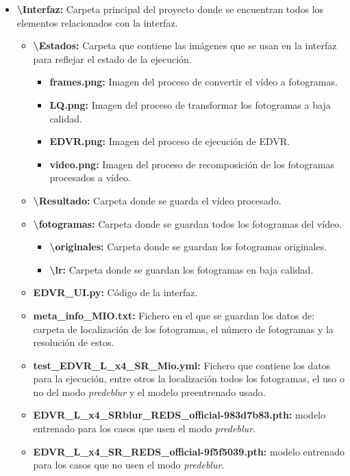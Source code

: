 \begin{itemize}
	\item \textbf{\textbackslash  Interfaz:} Carpeta principal del proyecto donde se encuentran todos los elementos relacionados con la interfaz.
	\begin{itemize}
		\item\textbf{\textbackslash  Estados:} Carpeta que contiene las imágenes que se usan en la interfaz para reflejar el estado de la ejecución.
		\begin{itemize}
			\item\textbf{frames.png:} Imagen del proceso de convertir el vídeo a fotogramas.
			\item\textbf{LQ.png:} Imagen del proceso de transformar los fotogramas a baja calidad.
			\item\textbf{EDVR.png:} Imagen del proceso de ejecución de EDVR.
			\item\textbf{video.png:} Imagen del proceso de recomposición de los fotogramas procesados a vídeo.
		\end{itemize}
		\item\textbf{\textbackslash  Resultado:} Carpeta donde se guarda el vídeo procesado.
		\item\textbf{\textbackslash  fotogramas:} Carpeta donde se guardan todos los fotogramas del vídeo.
		\begin{itemize}
			\item\textbf{\textbackslash  originales:} Carpeta donde se guardan los fotogramas originales.
			\item\textbf{\textbackslash  lr:} Carpeta donde se guardan los fotogramas en baja calidad.
		\end{itemize}
		\item\textbf{EDVR\_UI.py:} Código de la interfaz.
		\item\textbf{meta\_info\_MIO.txt:} Fichero en el que se guardan los datos de: carpeta de localización de los fotogramas, el número de fotogramas y la resolución de estos.
        \item\textbf{test\_EDVR\_L\_x4\_SR\_Mio.yml:} Fichero que contiene los datos para la ejecución, entre otros la localización todos los fotogramas, el uso o no del modo \emph{predeblur} y el modelo preentrenado usado.
        \item\textbf{EDVR\_L\_x4\_SRblur\_REDS\_official-983d7b83.pth:} modelo entrenado para los casos que usen el modo \emph{predeblur}.
        \item\textbf{EDVR\_L\_x4\_SR\_REDS\_official-9f5f5039.pth:} modelo entrenado para los casos que no usen el modo \emph{predeblur}.

\end{itemize}
\end{itemize}
